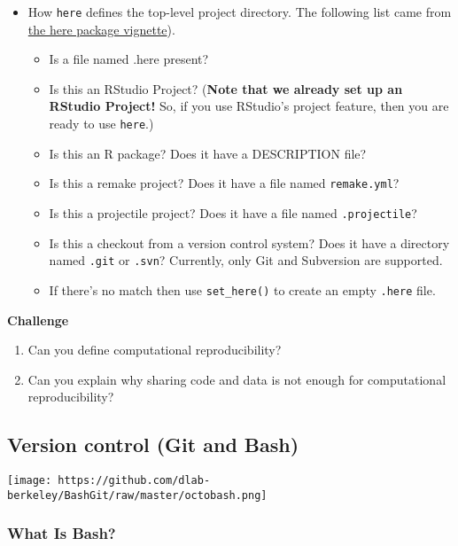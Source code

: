 \documentclass[
]{book}
\providecommand{\tightlist}{%
  \setlength{\itemsep}{0pt}\setlength{\parskip}{0pt}}
\begin{document}
\begin{itemize}
\item
  How \texttt{here} defines the top-level project directory. The following list came from \href{https://github.com/jennybc/here_here}{the here package vignette}).

  \begin{itemize}
  \item
    Is a file named .here present?
  \item
    Is this an RStudio Project? (\textbf{Note that we already set up an RStudio Project!} So, if you use RStudio's project feature, then you are ready to use \texttt{here}.)
  \item
    Is this an R package? Does it have a DESCRIPTION file?
  \item
    Is this a remake project? Does it have a file named \texttt{remake.yml}?
  \item
    Is this a projectile project? Does it have a file named \texttt{.projectile}?
  \item
    Is this a checkout from a version control system? Does it have a directory named \texttt{.git} or \texttt{.svn}? Currently, only Git and Subversion are supported.
  \item
    If there's no match then use \texttt{set\_here()} to create an empty \texttt{.here} file.
  \end{itemize}
\end{itemize}

\textbf{Challenge}

\begin{enumerate}
\def\labelenumi{\arabic{enumi}.}
\tightlist
\item
  Can you define computational reproducibility?
\item
  Can you explain why sharing code and data is not enough for computational reproducibility?
\end{enumerate}

\hypertarget{version-control-git-and-bash}{%
\subsection{Version control (Git and Bash)}\label{version-control-git-and-bash}}

\texttt{[image: https://github.com/dlab-berkeley/BashGit/raw/master/octobash.png]}

\hypertarget{what-is-bash}{%
\subsubsection{What Is Bash?}\label{what-is-bash}}
\end{document}
